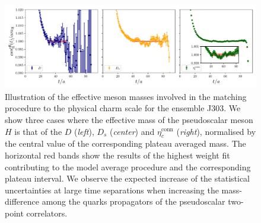    
\begin{figure}
   	\centering
   	\includegraphics[scale=0.4]{./cap6/figs/matching/meff_comparison.pdf}
   	\caption{Illustration of the effective meson masses involved in the matching procedure to the physical charm scale for the ensemble J303. We show three cases where the effective mass of the pseudoscalar meson $H$ is that of the $D$ (\textit{left}), $D_s$ (\textit{center}) and $\eta_c^{\mathrm{conn}}$  (\textit{right}), normalised by the central value of the corresponding plateau averaged mass.  The horizontal red bands show the results of the highest weight fit contributing to the model average procedure and the corresponding plateau interval. We observe the expected increase of the statistical uncertainties at large time separations when increasing the mass-difference among the quarks propagators of the pseudoscalar two-point correlators. 
}
\label{fig:corr_comparison}
\end{figure}
   
